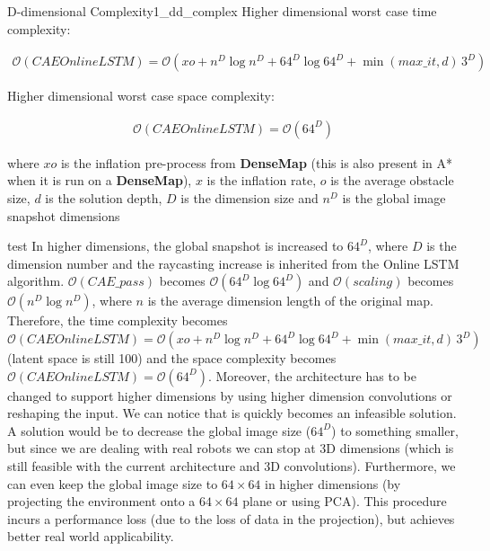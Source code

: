 \begin{Theo}{D-dimensional Complexity}{1_dd_complex}
Higher dimensional worst case time complexity:

\begin{align*}
    \mathcal{O}(CAEOnlineLSTM) = \mathcal{O}(xo + n^D \log n^D + 64^D \log 64^D + \min(max\_it, d)\,3^D)
\end{align*}

Higher dimensional worst case space complexity:

\begin{align*}
    \mathcal{O}(CAEOnlineLSTM) = \mathcal{O}(64^D)
\end{align*}

where $xo$ is the inflation pre-process from \textbf{DenseMap} (this is also present in A* when it is run on a \textbf{DenseMap}), $x$ is the inflation rate, $o$ is the average obstacle size, $d$ is the solution depth, $D$ is the dimension size and $n^D$ is the global image snapshot dimensions

\begin{Proof}{}{test}
In higher dimensions, the global snapshot is increased to $64^D$, where $D$ is the dimension number and the raycasting increase is inherited from the Online LSTM algorithm. $\mathcal{O}(CAE\_pass)$ becomes $\mathcal{O}(64^D \log 64^D)$ and $\mathcal{O}(scaling)$ becomes $\mathcal{O}(n^D \log n^D)$, where $n$ is the average dimension length of the original map. Therefore, the time complexity becomes $\mathcal{O}(CAEOnlineLSTM) = \mathcal{O}(xo + n^D \log n^D + 64^D \log 64^D + \min(max\_it, d)\,3^D)$ (latent space is still 100) and the space complexity becomes $\mathcal{O}(CAEOnlineLSTM) = \mathcal{O}(64^D)$. Moreover, the architecture has to be changed to support higher dimensions by using higher dimension convolutions or reshaping the input. We can notice that is quickly becomes an infeasible solution. A solution would be to decrease the global image size ($64^D$) to something smaller, but since we are dealing with real robots we can stop at 3D dimensions (which is still feasible with the current architecture and 3D convolutions). Furthermore, we can even keep the global image size to $64\times64$ in higher dimensions (by projecting the environment onto a $64\times64$ plane or using PCA). This procedure incurs a performance loss (due to the loss of data in the projection), but achieves better real world applicability.
\end{Proof}
\end{Theo}

